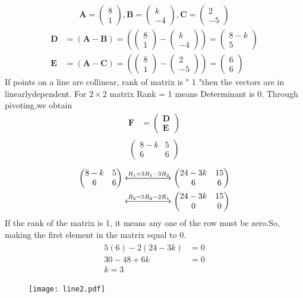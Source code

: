 \documentclass[journal,10pt,twocolumn]{article}
\newcommand{\myvec}[1]{\ensuremath{\begin{pmatrix}#1\end{pmatrix}}}
\let\vec\mathbf
\providecommand{\brak}[1]{\ensuremath{\left(#1\right)}}
\let\vec\mathbf
\begin{document}
\begin{enumerate}
\begin{align}  
\vec{A}=\myvec{8 \\ 1},
\vec{B}=\myvec{k \\ -4},
\vec{C}=\myvec{2 \\ -5}
\end{align}
\begin{align}  
 \vec{D} &=\brak{\vec{A}-\vec{B}} = \brak{\myvec{8 \\1 } - \myvec{k \\-4 } } = \myvec{8-k \\ 5 }\\
\vec{E} &= \brak{\vec{A}-\vec{C}} = \brak{\myvec{8 \\ 1 } - \myvec{2 \\-5 } } = \myvec{6 \\6}
\end{align}
If points on a line  are  collinear, rank of matrix is " 1 "then the vectors are in linearlydependent.
For $2\times2$ matrix Rank = 1 means Determinant is 0.
Through pivoting,we obtain
\begin{align}
\vec{F} &={\myvec{\vec{D}\\ \vec{E}}}
\end{align}
\begin{align}
\begin{split}
\myvec{
8-k & 5
 \\
6 & 6
}
\end{split}
\end{align}
\begin{align}
\label{eq:chem_balance_mat_row}
\myvec{
8-k & 5
\\
6 & 6
}
 \xleftrightarrow[]{R_1 = 3R_1-3R_2}
\myvec{
24-3k & 15
\\
6 & 6
}
\\
\xleftrightarrow[]{R_2 = 5R_2-2R_1}
\myvec{
24-3k & 15
\\
0 & 0
}
\end{align}
If the rank of the matrix is 1, it means any one of the row must be zero.So, making the first element in the matrix equal to 0.
\begin{align}
\begin{split}
 5(6)-2(24-3k)&=0
\\
30-48+6k&=0
\\
k=3
\end{split}
\end{align}

\begin{figure}[h]
	  \centering 
	  \texttt{[image: line2.pdf]}
	  \caption{}
	  \label{fig:line2.png}
	  \end{figure}
\end{enumerate} 
\end{document}
